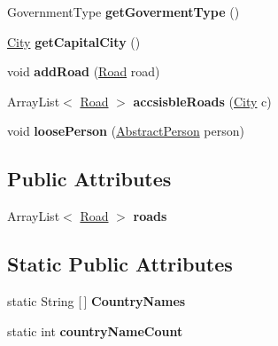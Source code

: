 \begin{DoxyCompactItemize}
\item 
Government\+Type {\bfseries get\+Goverment\+Type} ()\hypertarget{classplanets_1_1_country_aacd1e9f15b380cf0c12c4c2d3e9e4386}{}\label{classplanets_1_1_country_aacd1e9f15b380cf0c12c4c2d3e9e4386}

\item 
\hyperlink{classcities_1_1_city}{City} {\bfseries get\+Capital\+City} ()\hypertarget{classplanets_1_1_country_a84a88c7ad95e7f0c2872f5202dd242ee}{}\label{classplanets_1_1_country_a84a88c7ad95e7f0c2872f5202dd242ee}

\item 
void {\bfseries add\+Road} (\hyperlink{classplanets_1_1_road}{Road} road)\hypertarget{classplanets_1_1_country_a99a64c344c1ea25cda7d0a5b400a758b}{}\label{classplanets_1_1_country_a99a64c344c1ea25cda7d0a5b400a758b}

\item 
Array\+List$<$ \hyperlink{classplanets_1_1_road}{Road} $>$ {\bfseries accsisble\+Roads} (\hyperlink{classcities_1_1_city}{City} c)\hypertarget{classplanets_1_1_country_a68f7ca91762fe7641d166cf24f1c41d2}{}\label{classplanets_1_1_country_a68f7ca91762fe7641d166cf24f1c41d2}

\item 
void {\bfseries loose\+Person} (\hyperlink{classpeople_1_1_abstract_person}{Abstract\+Person} person)\hypertarget{classplanets_1_1_country_a8249f09ba89b197c8675ad508c0faab5}{}\label{classplanets_1_1_country_a8249f09ba89b197c8675ad508c0faab5}

\end{DoxyCompactItemize}
\subsection*{Public Attributes}
\begin{DoxyCompactItemize}
\item 
Array\+List$<$ \hyperlink{classplanets_1_1_road}{Road} $>$ {\bfseries roads}\hypertarget{classplanets_1_1_country_a7bc10e35409aa391eb2379448dc5a235}{}\label{classplanets_1_1_country_a7bc10e35409aa391eb2379448dc5a235}

\end{DoxyCompactItemize}
\subsection*{Static Public Attributes}
\begin{DoxyCompactItemize}
\item 
static String \mbox{[}$\,$\mbox{]} {\bfseries Country\+Names}
\item 
static int {\bfseries country\+Name\+Count}\hypertarget{classplanets_1_1_country_a81360dc2b0b3a631a632466980c5fdff}{}\label{classplanets_1_1_country_a81360dc2b0b3a631a632466980c5fdff}

\end{DoxyCompactItemize}
